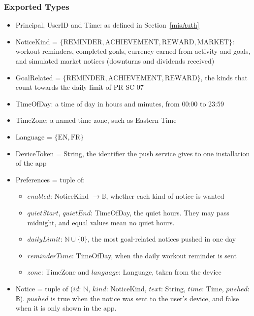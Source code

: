 \documentclass[12pt, titlepage]{article}
\begin{document}
\subsubsection{Exported Types}

\begin{itemize}
\item Principal, UserID and Time: as defined in Section~\ref{misAuth}
\item NoticeKind = $\{\mathrm{REMINDER}, \mathrm{ACHIEVEMENT},
  \mathrm{REWARD}, \mathrm{MARKET}\}$: workout reminders, completed goals,
  currency earned from activity and goals, and simulated market notices
  (downturns and dividends received)
\item GoalRelated = $\{\mathrm{REMINDER}, \mathrm{ACHIEVEMENT},
  \mathrm{REWARD}\}$, the kinds that count towards the daily limit of
  PR-SC-07
\item TimeOfDay: a time of day in hours and minutes, from 00:00 to 23:59
\item TimeZone: a named time zone, such as Eastern Time
\item Language = $\{\mathrm{EN}, \mathrm{FR}\}$
\item DeviceToken = String, the identifier the push service gives to one
  installation of the app
\item Preferences = tuple of:
  \begin{itemize}
  \item $\mathit{enabled}$: NoticeKind $\rightarrow \mathbb{B}$, whether
    each kind of notice is wanted
  \item $\mathit{quietStart}$, $\mathit{quietEnd}$: TimeOfDay, the quiet
    hours. They may pass midnight, and equal values mean no quiet hours.
  \item $\mathit{dailyLimit}$: $\mathbb{N} \cup \{0\}$, the most
    goal-related notices pushed in one day
  \item $\mathit{reminderTime}$: TimeOfDay, when the daily workout reminder
    is sent
  \item $\mathit{zone}$: TimeZone and $\mathit{language}$: Language, taken
    from the device
  \end{itemize}
\item Notice = tuple of ($\mathit{id}$: $\mathbb{N}$, $\mathit{kind}$:
  NoticeKind, $\mathit{text}$: String, $\mathit{time}$: Time,
  $\mathit{pushed}$: $\mathbb{B}$). $\mathit{pushed}$ is true when the notice
  was sent to the user's device, and false when it is only shown in the app.
\end{itemize}
\end{document}
